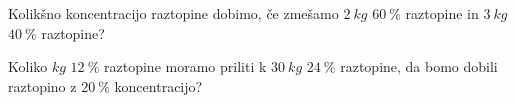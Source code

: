                 \begin{naloga}
                    Kolikšno koncentracijo raztopine dobimo, če zmešamo $2~kg$ $60~\%$ raztopine in $3~kg$ $40~\%$ raztopine? 
                \end{naloga}
    
                \begin{naloga}
                    Koliko $kg$ $12~\%$ raztopine moramo priliti k $30~kg$ $24~\%$ raztopine, da bomo dobili raztopino z $20~\%$ koncentracijo? 
                \end{naloga}
            






        
